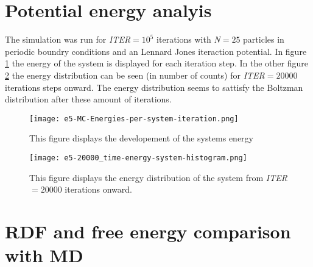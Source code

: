 \documentclass{article}[a4paper]
\begin{document}
\section{Potential energy analyis}
The simulation was run for \textit{ITER}$=10^5$ iterations with \textit{N}$=25$ particles in periodic boundry conditions and an Lennard Jones iteraction potential.
In figure \ref{fig:energy_developement} the energy of the system is displayed for each iteration step. In the other figure \ref{fig:energy_distribution} the energy distribution can be seen (in number of counts) for \textit{ITER}$=20000$ iterations steps onward. The energy distribution seems to sattisfy the Boltzman distribution after these amount of iterations.

\begin{figure}[h!]
    \centering
    \texttt{[image: e5-MC-Energies-per-system-iteration.png]}
    \caption{This figure displays the developement of the systems energy }
    \label{fig:energy_developement}
\end{figure}


\begin{figure}[h!]
    \centering    
    \texttt{[image: e5-20000\_time-energy-system-histogram.png]}
    \caption{This figure displays the energy distribution of the system from \textit{ITER}$=20000$ iterations onward.}
    \label{fig:energy_distribution}
\end{figure}

\newpage
\section{RDF and free energy comparison with MD}
\end{document}
